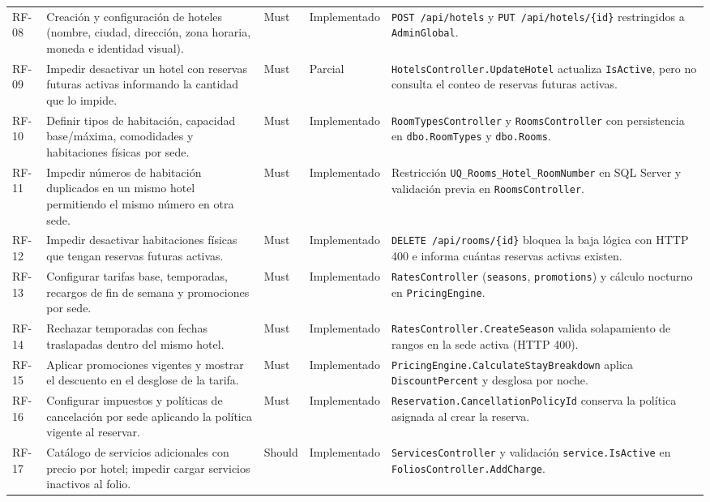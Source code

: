 \documentclass[12pt,a4paper]{article}
\begin{document}
\begin{longtable}{p{1.3cm} p{5.2cm} p{1.3cm} p{2.2cm} p{4.4cm}}
RF-08 & Creaci\'on y configuraci\'on de hoteles (nombre, ciudad, direcci\'on, zona horaria, moneda e identidad visual). & Must & Implementado & \texttt{POST /api/hotels} y \texttt{PUT /api/hotels/\{id\}} restringidos a \texttt{AdminGlobal}.\\[0.1cm]
RF-09 & Impedir desactivar un hotel con reservas futuras activas informando la cantidad que lo impide. & Must & Parcial & \texttt{HotelsController.UpdateHotel} actualiza \texttt{IsActive}, pero no consulta el conteo de reservas futuras activas.\\[0.1cm]
RF-10 & Definir tipos de habitaci\'on, capacidad base/m\'axima, comodidades y habitaciones f\'isicas por sede. & Must & Implementado & \texttt{RoomTypesController} y \texttt{RoomsController} con persistencia en \texttt{dbo.RoomTypes} y \texttt{dbo.Rooms}.\\[0.1cm]
RF-11 & Impedir n\'umeros de habitaci\'on duplicados en un mismo hotel permitiendo el mismo n\'umero en otra sede. & Must & Implementado & Restricci\'on \texttt{UQ\_Rooms\_Hotel\_RoomNumber} en SQL Server y validaci\'on previa en \texttt{RoomsController}.\\[0.1cm]
RF-12 & Impedir desactivar habitaciones f\'isicas que tengan reservas futuras activas. & Must & Implementado & \texttt{DELETE /api/rooms/\{id\}} bloquea la baja l\'ogica con HTTP 400 e informa cu\'antas reservas activas existen.\\[0.1cm]
RF-13 & Configurar tarifas base, temporadas, recargos de fin de semana y promociones por sede. & Must & Implementado & \texttt{RatesController} (\texttt{seasons}, \texttt{promotions}) y c\'alculo nocturno en \texttt{PricingEngine}.\\[0.1cm]
RF-14 & Rechazar temporadas con fechas traslapadas dentro del mismo hotel. & Must & Implementado & \texttt{RatesController.CreateSeason} valida solapamiento de rangos en la sede activa (HTTP 400).\\[0.1cm]
RF-15 & Aplicar promociones vigentes y mostrar el descuento en el desglose de la tarifa. & Must & Implementado & \texttt{PricingEngine.CalculateStayBreakdown} aplica \texttt{DiscountPercent} y desglosa por noche.\\[0.1cm]
RF-16 & Configurar impuestos y pol\'iticas de cancelaci\'on por sede aplicando la pol\'itica vigente al reservar. & Must & Implementado & \texttt{Reservation.CancellationPolicyId} conserva la pol\'itica asignada al crear la reserva.\\[0.1cm]
RF-17 & Cat\'alogo de servicios adicionales con precio por hotel; impedir cargar servicios inactivos al folio. & Should & Implementado & \texttt{ServicesController} y validaci\'on \texttt{service.IsActive} en \texttt{FoliosController.AddCharge}.\\[0.1cm]

\end{longtable}
\end{document}

